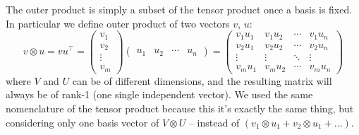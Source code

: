 \documentclass[12pt,a4paper]{article}
\begin{document}
The outer product is simply a subset of the tensor product once a basis is fixed. In particular we define outer product of two vectors $v$, $u$:
\begin{equation*}
	v\otimes u = vu^\top = 
	\begin{pmatrix} v_1 \\ v_2 \\ \vdots \\ v_m \end{pmatrix}
	\begin{pmatrix} u_1 & u_2 & \cdots & u_n \end{pmatrix}
	=
	\begin{pmatrix}
		v_1 u_1 & v_1 u_2 & \cdots & v_1 u_n \\
		v_2 u_1 & v_2 u_2 & \cdots & v_2 u_n \\
		\vdots & \vdots & \ddots & \vdots \\
		v_m u_1 & v_m u_2 & \cdots & v_m u_n
	\end{pmatrix}
\end{equation*}
where $V$ and $U$ can be of different dimensions, and the resulting matrix will always be of rank-1 (one single independent vector). We used the same nomenclature of the tensor product because this it's exactly the same thing, but considering only one basis vector of $V\otimes U$ -- instead of $(v_1\otimes u_1 + v_2\otimes u_1 + ...)$.
\end{document}
